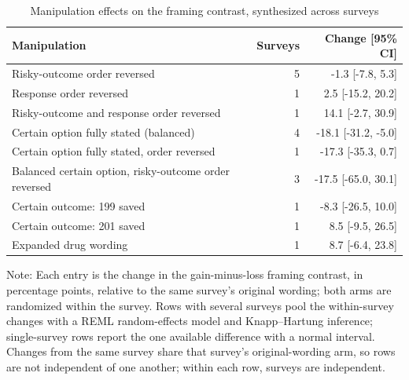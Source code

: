 \begin{table}[H]
\centering
\caption{\label{tab:manipulation-meta}Manipulation effects on the framing contrast, synthesized across surveys}
\centering
\begin{threeparttable}
\begin{tabular}[t]{lrr}
\toprule
Manipulation & Surveys & Change [95\% CI]\\
\midrule
Risky-outcome order reversed & 5 & -1.3 [-7.8, 5.3]\\
Response order reversed & 1 & 2.5 [-15.2, 20.2]\\
Risky-outcome and response order reversed & 1 & 14.1 [-2.7, 30.9]\\
Certain option fully stated (balanced) & 4 & -18.1 [-31.2, -5.0]\\
Certain option fully stated, order reversed & 1 & -17.3 [-35.3, 0.7]\\
Balanced certain option, risky-outcome order reversed & 3 & -17.5 [-65.0, 30.1]\\
Certain outcome: 199 saved & 1 & -8.3 [-26.5, 10.0]\\
Certain outcome: 201 saved & 1 & 8.5 [-9.5, 26.5]\\
Expanded drug wording & 1 & 8.7 [-6.4, 23.8]\\
\bottomrule
\end{tabular}
\begin{tablenotes}[para]
\item Note: Each entry is the change in the gain-minus-loss framing contrast, in percentage points, relative to the same survey's original wording; both arms are randomized within the survey. Rows with several surveys pool the within-survey changes with a REML random-effects model and Knapp--Hartung inference; single-survey rows report the one available difference with a normal interval. Changes from the same survey share that survey's original-wording arm, so rows are not independent of one another; within each row, surveys are independent.
\end{tablenotes}
\end{threeparttable}
\end{table}
